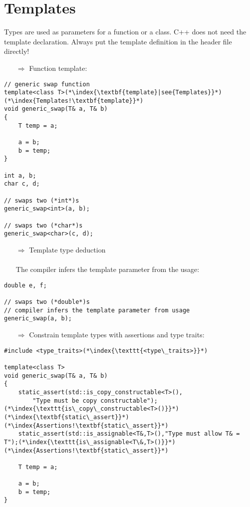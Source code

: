 \documentclass[10pt]{book}
\begin{document}
\section{Templates}
Types are used as parameters for a function or a class.  C++ does not need the template declaration. Always put the 
template definition in the header file directly!
\begin{enumerate}
\item[$\Rightarrow$] Function template:
\end{enumerate}
\begin{lstlisting}
// generic swap function
template<class T>(*\index{\textbf{template}|see{Templates}}*)(*\index{Templates!\textbf{template}}*)
void generic_swap(T& a, T& b)
{
    T temp = a;
    
    a = b;
    b = temp;
}

int a, b;
char c, d;

// swaps two (*int*)s
generic_swap<int>(a, b);

// swaps two (*char*)s
generic_swap<char>(c, d);
\end{lstlisting}
\begin{enumerate}
\item[$\Rightarrow$] Template type deduction\\ \\ The compiler infers the template parameter from the usage:
\end{enumerate}
\begin{lstlisting}
double e, f;

// swaps two (*double*)s
// compiler infers the template parameter from usage
generic_swap(a, b);
\end{lstlisting}
\begin{enumerate}
\item[$\Rightarrow$] Constrain template types with assertions and type traits:
\end{enumerate}
\begin{lstlisting}
#include <type_traits>(*\index{\texttt{<type\_traits>}}*)

template<class T>
void generic_swap(T& a, T& b)
{
    static_assert(std::is_copy_constructable<T>(),
        "Type must be copy constructable");(*\index{\texttt{is\_copy\_constructable<T>()}}*)(*\index{\textbf{static\_assert}}*)(*\index{Assertions!\textbf{static\_assert}}*)
    static_assert(std::is_assignable<T&,T>(),"Type must allow T& = T");(*\index{\texttt{is\_assignable<T\&,T>()}}*)(*\index{Assertions!\textbf{static\_assert}}*)
    
    T temp = a;
    
    a = b;
    b = temp;
}
\end{lstlisting}
\end{document}
